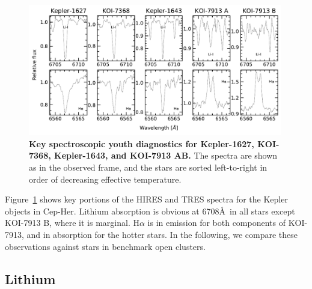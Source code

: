 \documentclass[12pt,twocolumn,linenumbers]{aastex63}
\begin{document}
\begin{figure}[tp]
	\begin{center}
		\leavevmode
			\includegraphics[width=0.99\textwidth]{f5.pdf}
	\end{center}
	\vspace{-0.3cm}
	\caption{
    {\bf Key spectroscopic youth diagnostics for Kepler-1627, KOI-7368,
    Kepler-1643, and KOI-7913 AB. }
    The spectra are shown as in the observed frame, and
    the stars are sorted left-to-right in order of decreasing effective temperature.
    \label{fig:koiyouthindicators}
	}
\end{figure}

Figure~\ref{fig:koiyouthindicators} shows key portions of the HIRES
and TRES spectra for the Kepler objects in Cep-Her.
Lithium absorption is obvious at 6708\AA\ in all stars except KOI-7913 B, where it is marginal.
H$\alpha$ is in emission for both components of KOI-7913,
and in absorption for the hotter stars.
In the following, 
we compare these observations against stars in benchmark
open clusters.

\subsection{Lithium}
\end{document}
